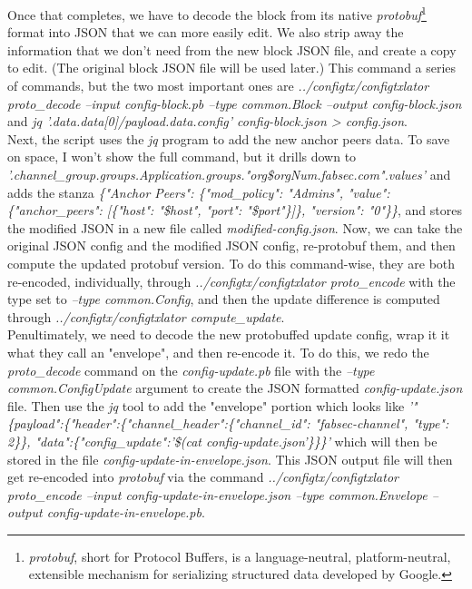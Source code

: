 \begin{itemize}
					\hspace{10mm}Once that completes, we have to decode the block from its native \textit{protobuf}\footnote{\textit{protobuf}, short for Protocol Buffers, is a language-neutral, platform-neutral, extensible mechanism for serializing structured data developed by Google.} format into JSON that we can more easily edit. We also strip away the information that we don't need from the new block JSON file, and create a copy to edit. (The original block JSON file will be used later.) This command a series of commands, but the two most important ones are \textit{../configtx/configtxlator proto\_decode --input config-block.pb --type common.Block --output config-block.json} and \textit{jq '.data.data[0]/payload.data.config' config-block.json > config.json}.\\
					
					\hspace{10mm}Next, the script uses the \textit{jq} program to add the new anchor peers data. To save on space, I won't show the full command, but it drills down to \textit{'.channel\_group.groups.Application.groups."org\$orgNum.fabsec.com".values'} and adds the stanza \textit{\{"Anchor Peers": \{"mod\_policy": "Admins", "value":\{"anchor\_peers": [\{"host": "\$host", "port": "\$port"\}]\}, "version": "0"\}\}}, and stores the modified JSON in a new file called \textit{modified-config.json}. Now, we can take the original JSON config and the modified JSON config, re-protobuf them, and then compute the updated protobuf version. To do this command-wise, they are both re-encoded, individually, through \textit{../configtx/configtxlator proto\_encode} with the type set to \textit{--type common.Config}, and then the update difference is computed through \textit{../configtx/configtxlator compute\_update}.\\
					
					\hspace{10mm}Penultimately, we need to decode the new protobuffed update config, wrap it it what they call an "envelope", and then re-encode it. To do this, we redo the \textit{proto\_decode} command on the \textit{config-update.pb} file with the \textit{--type common.ConfigUpdate} argument to create the JSON formatted \textit{config-update.json} file. Then use the \textit{jq} tool to add the "envelope" portion which looks like \textit{'"\{payload":\{"header":\{"channel\_header":\{"channel\_id": "fabsec-channel", "type": 2\}\}, "data":\{"config\_update":'\$(cat config-update.json'\}\}\}'} which will then be stored in the file \textit{config-update-in-envelope.json}. This JSON output file will then get re-encoded into \textit{protobuf} via the command \textit{../configtx/configtxlator proto\_encode --input config-update-in-envelope.json --type common.Envelope --output config-update-in-envelope.pb}.\\
					

\end{itemize}
